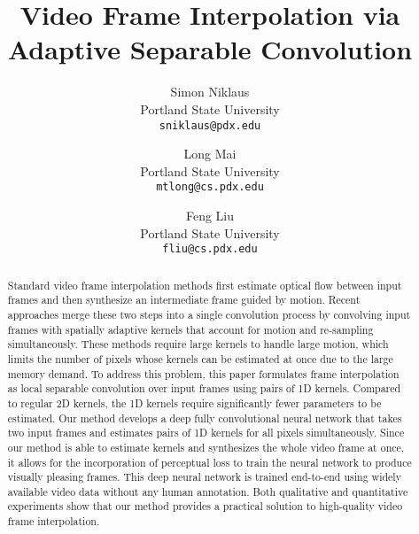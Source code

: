 \documentclass[10pt,twocolumn,letterpaper]{article}
\begin{document}
\title{Video Frame Interpolation via Adaptive Separable Convolution}

\author{Simon Niklaus\\
Portland State University\\
{\tt\small sniklaus@pdx.edu}
\and
Long Mai\\
Portland State University\\
{\tt\small mtlong@cs.pdx.edu}
\and
Feng Liu\\
Portland State University\\
{\tt\small fliu@cs.pdx.edu}
}

\maketitle

\begin{abstract}

    Standard video frame interpolation methods first estimate optical flow between input frames and then synthesize an intermediate frame guided by motion. Recent approaches merge these two steps into a single convolution process by convolving input frames with spatially adaptive kernels that account for motion and re-sampling simultaneously. These methods require large kernels to handle large motion, which limits the number of pixels whose kernels can be estimated at once due to the large memory demand. To address this problem, this paper formulates frame interpolation as local separable convolution over input frames using pairs of 1D kernels. Compared to regular 2D kernels, the 1D kernels require significantly fewer parameters to be estimated. Our method develops a deep fully convolutional neural network that takes two input frames and estimates pairs of 1D kernels for all pixels simultaneously. Since our method is able to estimate kernels and synthesizes the whole video frame at once, it allows for the incorporation of perceptual loss to train the neural network to produce visually pleasing frames. This deep neural network is trained end-to-end using widely available video data without any human annotation. Both qualitative and quantitative experiments show that our method provides a practical solution to high-quality video frame interpolation.

\end{abstract}

\vspace{-0.15in}
\end{document}
